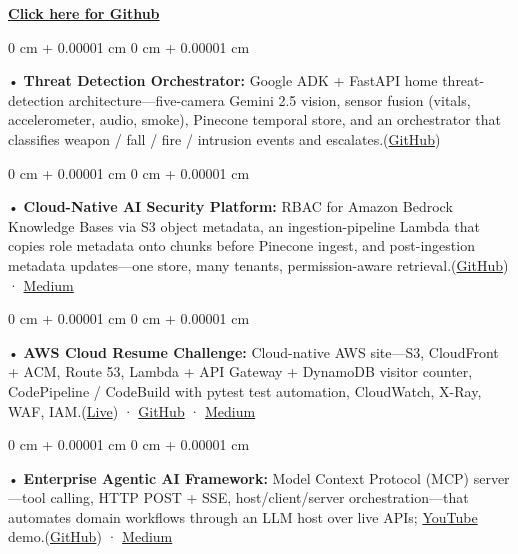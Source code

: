 \documentclass[10pt, letterpaper]{article}
\newenvironment{onecolentry}{
    \begin{adjustwidth}{
        0 cm + 0.00001 cm
    }{
        0 cm + 0.00001 cm
    }
}{
    \end{adjustwidth}
} %
\begin{document}
\textbf{\href{https://github.com/daedalus-s}{Click here for Github}}
\begin{onecolentry}
     • \textbf{Threat Detection Orchestrator:} Google ADK + FastAPI home threat-detection architecture---five-camera Gemini 2.5 vision, sensor fusion (vitals, accelerometer, audio, smoke), Pinecone temporal store, and an orchestrator that classifies weapon / fall / fire / intrusion events and escalates.(\href{https://github.com/daedalus-s/threat-gdg-adk}{GitHub})
\end{onecolentry}
\begin{onecolentry}
     • \textbf{Cloud-Native AI Security Platform:} RBAC for Amazon Bedrock Knowledge Bases via S3 object metadata, an ingestion-pipeline Lambda that copies role metadata onto chunks before Pinecone ingest, and post-ingestion metadata updates---one store, many tenants, permission-aware retrieval.(\href{https://github.com/daedalus-s/bedrock-acl-metadata}{GitHub}) · \href{https://medium.com/@sreenikethaathreya/building-a-permission-aware-genai-application-on-amazon-bedrock-8fdc2410dd43}{Medium}
\end{onecolentry}
\begin{onecolentry}
     • \textbf{AWS Cloud Resume Challenge:} Cloud-native AWS site---S3, CloudFront + ACM, Route 53, Lambda + API Gateway + DynamoDB visitor counter, CodePipeline / CodeBuild with pytest test automation, CloudWatch, X-Ray, WAF, IAM.(\href{https://sreenikethaathreya.com}{Live}) · \href{https://github.com/daedalus-s/resume-website}{GitHub} · \href{https://medium.com/@sreenikethaathreya/cloud-resume-challenge-c4f17c3d53ff}{Medium}
\end{onecolentry}
\begin{onecolentry}
     • \textbf{Enterprise Agentic AI Framework:} Model Context Protocol (MCP) server---tool calling, HTTP POST + SSE, host/client/server orchestration---that automates domain workflows through an LLM host over live APIs; \href{https://www.youtube.com/watch?v=op2gTYyFb5U}{YouTube} demo.(\href{https://github.com/daedalus-s/dota2-mcp-server}{GitHub}) · \href{https://medium.com/@sreenikethaathreya/get-good-at-using-ai-noob-5d2576203112}{Medium}
\end{onecolentry}
\vspace{2 pt }
        \vspace{2 pt }
\end{document}
